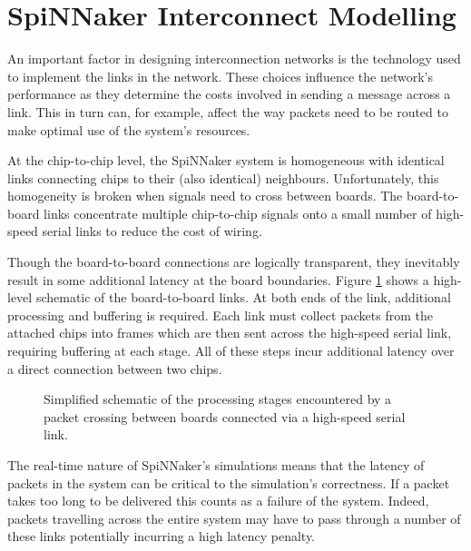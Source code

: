 	\section{SpiNNaker Interconnect Modelling}
		
		\label{sec:interconnect-modelling}
		
		
		An important factor in designing interconnection networks is the technology
		used to implement the links in the network. These choices influence the
		network's performance as they determine the costs involved in sending a
		message across a link. This in turn can, for example, affect the way packets
		need to be routed to make optimal use of the system's resources.
		
		At the chip-to-chip level, the SpiNNaker system is homogeneous with
		identical links connecting chips to their (also identical) neighbours.
		Unfortunately, this homogeneity is broken when signals need to cross between
		boards. The board-to-board links concentrate multiple chip-to-chip signals
		onto a small number of high-speed serial links to reduce the cost of wiring.
		
		Though the board-to-board connections are logically transparent, they
		inevitably result in some additional latency at the board boundaries. Figure
		\ref{fig:boardToBoardSchematic} shows a high-level schematic of the
		board-to-board links. At both ends of the link, additional processing and
		buffering is required. Each link must collect packets from the attached
		chips into frames which are then sent across the high-speed serial link,
		requiring buffering at each stage. All of these steps incur additional
		latency over a direct connection between two chips.
		
		\begin{figure}
			\center
			
			\caption[SpiNNaker high-speed serial board-to-board
			link schematic.]{Simplified schematic of the processing stages encountered by a
			packet crossing between boards connected via a high-speed serial link.}
			\label{fig:boardToBoardSchematic}
		\end{figure}
		
		The real-time nature of SpiNNaker's simulations means that the latency of
		packets in the system can be critical to the simulation's correctness. If a
		packet takes too long to be delivered this counts as a failure of the
		system. Indeed, packets travelling across the entire system may have to pass
		through a number of these links potentially incurring a high latency
		penalty.
		
